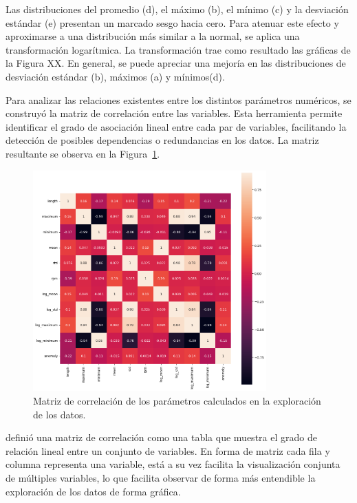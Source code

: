 \documentclass[11pt,a4paper,spanish]{book}
\numberwithin{equation}{chapter}
\numberwithin{figure}{chapter}
\begin{document}
Las distribuciones del promedio (d), el máximo (b), el mínimo (c) y la desviación estándar (e) presentan un marcado sesgo hacia cero. Para atenuar este efecto y aproximarse a una distribución más similar a la normal, se aplica una transformación logarítmica. La transformación trae como resultado las gráficas de la Figura XX. En general, se puede apreciar una mejoría en las distribuciones de desviación estándar (b), máximos (a) y mínimos(d). 

Para analizar las relaciones existentes entre los distintos parámetros numéricos, se construyó la matriz de correlación entre las variables. Esta herramienta permite identificar el grado de asociación lineal entre cada par de variables, facilitando la detección de posibles dependencias o redundancias en los datos. La matriz resultante se observa en la Figura~\ref{fig:figCorrMat}. 


\begin{figure}[h]
    \centering
    \includegraphics[width=0.8\textwidth]{media/dataset/corr-mat.png}
    \caption{Matriz de correlación de los parámetros calculados en la exploración de los datos. }
    \label{fig:figCorrMat}
\end{figure}


\cite{Alvarez2023} definió una matriz de correlación como una tabla que muestra el grado de relación lineal entre un conjunto de variables. En forma de matriz cada fila y columna representa una variable, está a su vez facilita la visualización conjunta de múltiples variables, lo que facilita observar de forma más entendible la exploración de los datos de forma gráfica.
\end{document}
